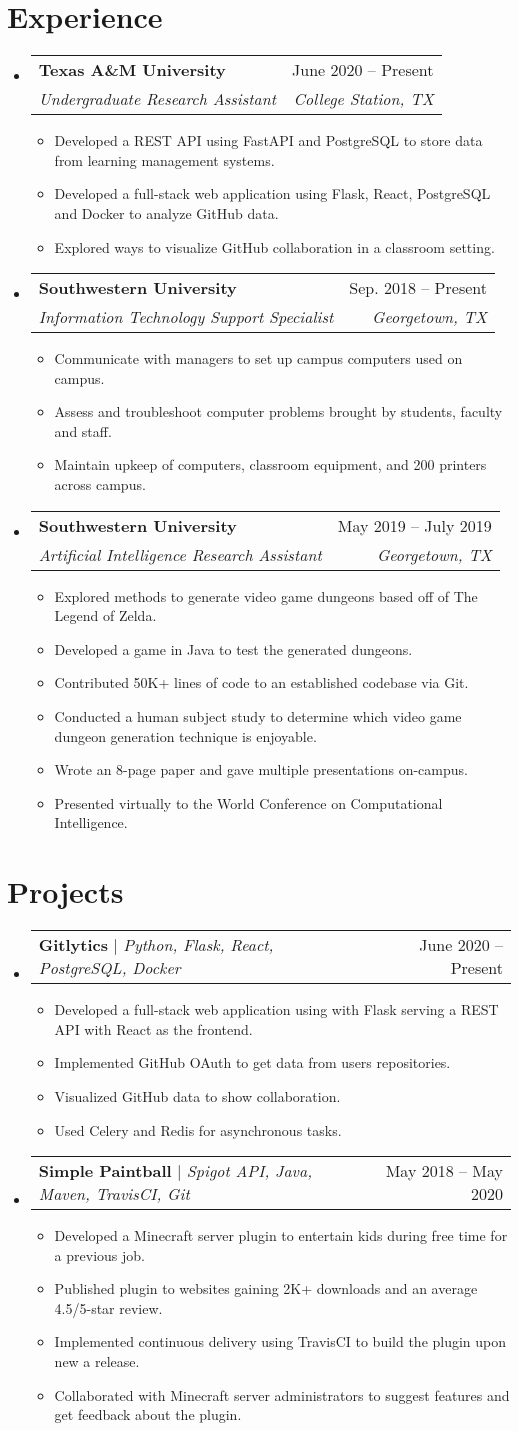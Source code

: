 \documentclass[letterpaper,11pt]{article}
\makeatletter
\newcommand{\resumeItem}[1]{
\item\small{
{#1 \vspace{-2pt}}
}
}
\newcommand{\resumeSubheading}[4]{
\vspace{-2pt}\item
\begin{tabular*}{0.97\textwidth}[t]{l@{\extracolsep{\fill}}r}
\textbf{#1} & #2 \\
\textit{\small#3} & \textit{\small #4} \\
\end{tabular*}\vspace{-7pt}
}
\newcommand{\resumeProjectHeading}[2]{
\item
\begin{tabular*}{0.97\textwidth}{l@{\extracolsep{\fill}}r}
\small#1 & #2 \\
\end{tabular*}\vspace{-7pt}
}
\newcommand{\resumeSubHeadingListStart}{\begin{itemize}[leftmargin=0.15in, label={}]}
\newcommand{\resumeSubHeadingListEnd}{\end{itemize}}
\newcommand{\resumeItemListStart}{\begin{itemize}}
\newcommand{\resumeItemListEnd}{\end{itemize}\vspace{-5pt}}
\makeatother
\begin{document}
\section{Experience}
\resumeSubHeadingListStart
\resumeSubheading{Texas A\&M University}{June 2020 – Present}{Undergraduate Research Assistant}{College Station, TX}
\resumeItemListStart
\resumeItem{Developed a REST API using FastAPI and PostgreSQL to store data from learning management systems.}
\resumeItem{Developed a full-stack web application using Flask, React, PostgreSQL and Docker to analyze GitHub data.}
\resumeItem{Explored ways to visualize GitHub collaboration in a classroom setting.}
\resumeItemListEnd
\resumeSubheading{Southwestern University}{Sep. 2018 – Present}{Information Technology Support Specialist}{Georgetown, TX}
\resumeItemListStart
\resumeItem{Communicate with managers to set up campus computers used on campus.}
\resumeItem{Assess and troubleshoot computer problems brought by students, faculty and staff.}
\resumeItem{Maintain upkeep of computers, classroom equipment, and 200 printers across campus.}
\resumeItemListEnd
\resumeSubheading{Southwestern University}{May 2019 – July 2019}{Artificial Intelligence Research Assistant}{Georgetown, TX}
\resumeItemListStart
\resumeItem{Explored methods to generate video game dungeons based off of The Legend of Zelda.}
\resumeItem{Developed a game in Java to test the generated dungeons.}
\resumeItem{Contributed 50K+ lines of code to an established codebase via Git.}
\resumeItem{Conducted a human subject study to determine which video game dungeon generation technique is enjoyable.}
\resumeItem{Wrote an 8-page paper and gave multiple presentations on-campus.}
\resumeItem{Presented virtually to the World Conference on Computational Intelligence.}
\resumeItemListEnd
\resumeSubHeadingListEnd

\section{Projects}
\resumeSubHeadingListStart
\resumeProjectHeading{\textbf{Gitlytics} $|$ \emph{Python, Flask, React, PostgreSQL, Docker}}{June 2020 – Present}
\resumeItemListStart
\resumeItem{Developed a full-stack web application using with Flask serving a REST API with React as the frontend.}
\resumeItem{Implemented GitHub OAuth to get data from users repositories.}
\resumeItem{Visualized GitHub data to show collaboration.}
\resumeItem{Used Celery and Redis for asynchronous tasks.}
\resumeItemListEnd
\resumeProjectHeading{\textbf{Simple Paintball} $|$ \emph{Spigot API, Java, Maven, TravisCI, Git}}{May 2018 – May 2020}
\resumeItemListStart
\resumeItem{Developed a Minecraft server plugin to entertain kids during free time for a previous job.}
\resumeItem{Published plugin to websites gaining 2K+ downloads and an average 4.5/5-star review.}
\resumeItem{Implemented continuous delivery using TravisCI to build the plugin upon new a release.}
\resumeItem{Collaborated with Minecraft server administrators to suggest features and get feedback about the plugin.}
\resumeItemListEnd
\resumeSubHeadingListEnd
\end{document}
